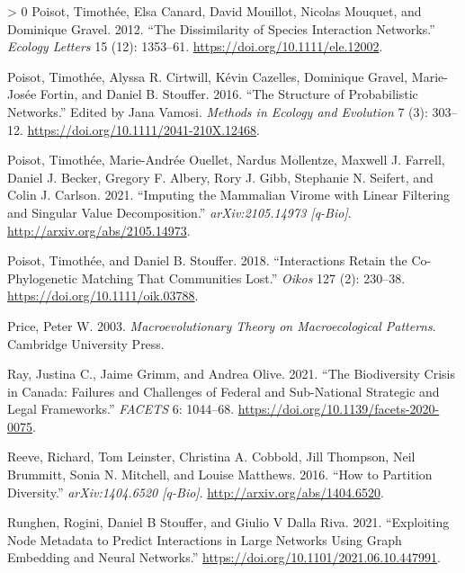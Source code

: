 \documentclass[11pt]{article}
\newlength{\cslhangindent}
\newenvironment{CSLReferences}[3] %
 {%
  \setlength{\parindent}{0pt}
  \ifodd #1 \everypar{\setlength{\hangindent}{\cslhangindent}}\ignorespaces\fi
  \ifnum #2 > 0
  \setlength{\parskip}{#2\baselineskip}
  \fi
 }%
 {}
\begin{document}
\begin{CSLReferences}{1}{0}
\leavevmode\hypertarget{ref-Poisot2012DisSpe}{}%
Poisot, Timothée, Elsa Canard, David Mouillot, Nicolas Mouquet, and
Dominique Gravel. 2012. {``The Dissimilarity of Species Interaction
Networks.''} \emph{Ecology Letters} 15 (12): 1353--61.
\url{https://doi.org/10.1111/ele.12002}.

\leavevmode\hypertarget{ref-Poisot2016StrPro}{}%
Poisot, Timothée, Alyssa R. Cirtwill, Kévin Cazelles, Dominique Gravel,
Marie-Josée Fortin, and Daniel B. Stouffer. 2016. {``The Structure of
Probabilistic Networks.''} Edited by Jana Vamosi. \emph{Methods in
Ecology and Evolution} 7 (3): 303--12.
\url{https://doi.org/10.1111/2041-210X.12468}.

\leavevmode\hypertarget{ref-Poisot2021ImpMam}{}%
Poisot, Timothée, Marie-Andrée Ouellet, Nardus Mollentze, Maxwell J.
Farrell, Daniel J. Becker, Gregory F. Albery, Rory J. Gibb, Stephanie N.
Seifert, and Colin J. Carlson. 2021. {``Imputing the Mammalian Virome
with Linear Filtering and Singular Value Decomposition.''}
\emph{arXiv:2105.14973 {[}q-Bio{]}}.
\url{http://arxiv.org/abs/2105.14973}.

\leavevmode\hypertarget{ref-Poisot2018IntRet}{}%
Poisot, Timothée, and Daniel B. Stouffer. 2018. {``Interactions Retain
the Co-Phylogenetic Matching That Communities Lost.''} \emph{Oikos} 127
(2): 230--38. \url{https://doi.org/10.1111/oik.03788}.

\leavevmode\hypertarget{ref-Price2003MacThe}{}%
Price, Peter W. 2003. \emph{Macroevolutionary Theory on Macroecological
Patterns}. Cambridge University Press.

\leavevmode\hypertarget{ref-Ray2021BioCri}{}%
Ray, Justina C., Jaime Grimm, and Andrea Olive. 2021. {``The
Biodiversity Crisis in Canada: Failures and Challenges of Federal and
Sub-National Strategic and Legal Frameworks.''} \emph{FACETS} 6:
1044--68. \url{https://doi.org/10.1139/facets-2020-0075}.

\leavevmode\hypertarget{ref-Reeve2016HowPar}{}%
Reeve, Richard, Tom Leinster, Christina A. Cobbold, Jill Thompson, Neil
Brummitt, Sonia N. Mitchell, and Louise Matthews. 2016. {``How to
Partition Diversity.''} \emph{arXiv:1404.6520 {[}q-Bio{]}}.
\url{http://arxiv.org/abs/1404.6520}.

\leavevmode\hypertarget{ref-Runghen2021ExpNod}{}%
Runghen, Rogini, Daniel B Stouffer, and Giulio V Dalla Riva. 2021.
{``Exploiting Node Metadata to Predict Interactions in Large Networks
Using Graph Embedding and Neural Networks.''}
\url{https://doi.org/10.1101/2021.06.10.447991}.


\end{CSLReferences}
\end{document}
